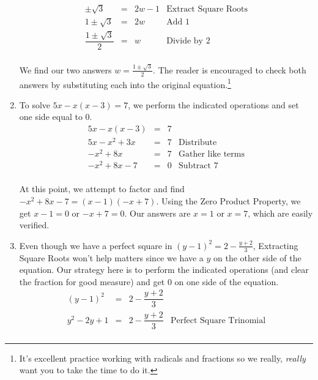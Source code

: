 \documentclass{ximera}
\begin{document}
\begin{ex}
\begin{enumerate}
\[\begin{array}{rclr}
\pm \sqrt{3} & = & 2w - 1 & \text{Extract Square Roots} \\

1 \pm \sqrt{3} & = & 2w & \text{Add $1$} \\

\dfrac{1 \pm \sqrt{3}}{2} & = & w & \text{Divide by $2$} \\

\end{array} \]

We find our two answers $w = \frac{1 \pm \sqrt{3}}{2}$.  The reader is encouraged to check both answers by substituting each into the original equation.\footnote{It's excellent  practice working with radicals and fractions so we really, \emph{really} want you to take the time to do it.}

\item To solve $5x - x(x-3) = 7$, we perform the indicated operations and set one side equal to $0$.\[ \begin{array}{rclr}

5x - x(x-3) & = & 7 & \\

5x - x^2 + 3x & = & 7 & \text{Distribute} \\

-x^2 + 8x & = & 7 & \text{Gather like terms} \\

-x^2 + 8x - 7 & = & 0& \text{Subtract $7$} \\

\end{array}\]

At this point, we attempt to factor and find $-x^2 + 8x - 7 = (x-1)(-x+7)$.  Using the Zero Product Property, we get $x-1 = 0$  or $-x+7 = 0$.  Our answers are $x = 1$ or $x = 7$, which are easily verified.

\item Even though we have a perfect square in $(y-1)^2 = 2 - \frac{y+2}{3}$, Extracting Square Roots won't help matters since we have a $y$ on the other side of the equation.  Our strategy here is to perform the indicated operations (and clear the fraction for good measure) and get $0$ on one side of the equation.\[ \begin{array}{rclr}

(y-1)^2 & = &  2 - \dfrac{y+2}{3} & \\ [8pt]

y^2 - 2y + 1 & = & 2 - \dfrac{y+2}{3} & \text{Perfect Square Trinomial}\\ [8pt]


\end{array}\]
\end{enumerate}
\end{ex}
\end{document}
